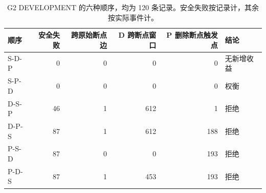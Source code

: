 \begin{table}[H]
\centering\small
\caption{G2 DEVELOPMENT 的六种顺序，均为 120 条记录。安全失败按记录计，其余按实际事件计。}
\begin{tabular}{lrrrrl}
\toprule 顺序 & 安全失败 & 跨原始断点边 & D 跨断点窗口 & P 删除断点触发点 & 结论 \\ \midrule
S-D-P & 0 & 0 & 0 & 0 & 无新增收益 \\
S-P-D & 0 & 0 & 0 & 0 & 权衡 \\
D-S-P & 46 & 1 & 612 & 1 & 拒绝 \\
D-P-S & 87 & 1 & 612 & 188 & 拒绝 \\
P-S-D & 87 & 0 & 0 & 193 & 拒绝 \\
P-D-S & 87 & 1 & 453 & 193 & 拒绝 \\
\bottomrule\end{tabular}
\end{table}
